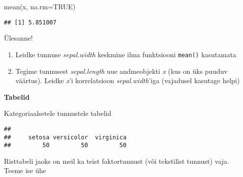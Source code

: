 \documentclass[
]{book}
\newenvironment{Shaded}{\begin{snugshade}}{\end{snugshade}}
\newcommand{\AttributeTok}[1]{\textcolor[rgb]{0.77,0.63,0.00}{#1}}
\newcommand{\CommentTok}[1]{\textcolor[rgb]{0.56,0.35,0.01}{\textit{#1}}}
\newcommand{\ConstantTok}[1]{\textcolor[rgb]{0.00,0.00,0.00}{#1}}
\newcommand{\DecValTok}[1]{\textcolor[rgb]{0.00,0.00,0.81}{#1}}
\newcommand{\FunctionTok}[1]{\textcolor[rgb]{0.00,0.00,0.00}{#1}}
\newcommand{\NormalTok}[1]{#1}
\newcommand{\OtherTok}[1]{\textcolor[rgb]{0.56,0.35,0.01}{#1}}
\newcommand{\SpecialCharTok}[1]{\textcolor[rgb]{0.00,0.00,0.00}{#1}}
\newcommand{\StringTok}[1]{\textcolor[rgb]{0.31,0.60,0.02}{#1}}
\providecommand{\tightlist}{%
  \setlength{\itemsep}{0pt}\setlength{\parskip}{0pt}}
\begin{document}
\begin{Shaded}
\begin{Highlighting}[]
\FunctionTok{mean}\NormalTok{(x, }\AttributeTok{na.rm=}\ConstantTok{TRUE}\NormalTok{)}
\end{Highlighting}
\end{Shaded}

\begin{verbatim}
## [1] 5.851007
\end{verbatim}

Ülesanne!

\begin{enumerate}
\def\labelenumi{\arabic{enumi}.}
\tightlist
\item
  Leidke tunnuse \emph{sepal.width} keskmine ilma funktsiooni \texttt{mean()} kasutamata
\item
  Tegime tunnusest \emph{sepal.length} uue andmeobjekti \emph{x} (kus on üks puuduv väärtus). Leidke \emph{x}'i korrelatsioon \emph{sepal.width}'iga (vajadusel kasutage helpi)
\end{enumerate}

\textbf{Tabelid}

Kategoriaalsetele tunnustele tabelid

\begin{Shaded}
\end{Shaded}

\begin{verbatim}
## 
##     setosa versicolor  virginica 
##         50         50         50
\end{verbatim}

Risttabeli jaoks on meil ka teist faktortunnust (või tekstilist tunnust) vaja. Teeme ise ühe

\begin{Shaded}
\end{Shaded}
\end{document}
